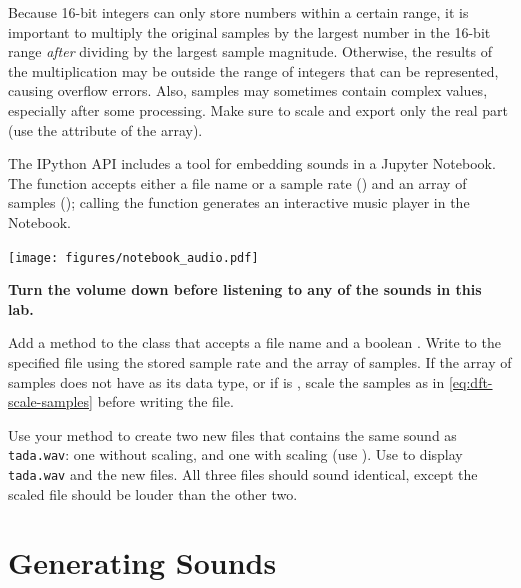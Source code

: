 Because 16-bit integers can only store numbers within a certain range, it is important to multiply the original samples by the largest number in the 16-bit range \emph{after} dividing by the largest sample magnitude.
Otherwise, the results of the multiplication may be outside the range of integers that can be represented, causing overflow errors.
Also, samples may sometimes contain complex values, especially after some processing.
Make sure to scale and export only the real part (use the  attribute of the array).

\begin{info} %
The IPython API includes a tool for embedding sounds in a Jupyter Notebook.
The function  accepts either a file name or a sample rate () and an array of samples (); calling the function generates an interactive music player in the Notebook.
\begin{center}
\texttt{[image: figures/notebook\_audio.pdf]}
\end{center}
\end{info}

\begin{warn}
\textbf{Turn the volume down before listening to any of the sounds in this lab.}
\end{warn}

\begin{problem} %
Add a method to the  class that accepts a file name and a boolean .
Write to the specified file using the stored sample rate and the array of samples.
If the array of samples does not have  as its data type, or if  is , scale the samples as in \eqref{eq:dft-scale-samples} before writing the file.

Use your method to create two new files that contains the same sound as \texttt{tada.wav}: one without scaling, and one with scaling (use ).
Use  to display \texttt{tada.wav} and the new files.
All three files should sound identical, except the scaled file should be louder than the other two.
\end{problem}

\section*{Generating Sounds} %

